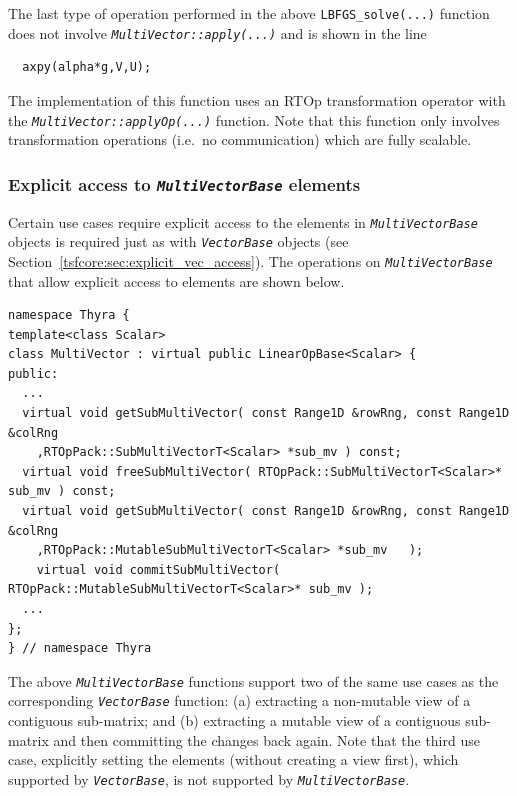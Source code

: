 \documentclass[pdf,ps2pdf,11pt]{SANDreport}
\begin{document}
The last type of operation performed in the above
{}\texttt{LBFGS\_solve(...)}  function does not involve
{}\texttt{\textit{Multi\-Vector\-::apply(\-...)}} and is shown in the
line

{\scriptsize\begin{verbatim}
  axpy(alpha*g,V,U);
\end{verbatim}}

{}\noindent{}The implementation of this function uses an RTOp
transformation operator with the
{}\texttt{\textit{Multi\-Vector\-::applyOp(\-...)}}  function.  Note
that this function only involves transformation operations (i.e.~no
communication) which are fully scalable.

%
\subsubsection{Explicit access to {}\texttt{\textit{Multi\-Vector\-Base}} elements}
\label{tsfcore:sec:explicit_multi_vec_access}
%

Certain use cases require explicit access to the elements in
{}\texttt{\textit{Multi\-Vector\-Base}} objects is required just as with
{}\texttt{\textit{Vector\-Base}} objects (see
Section~\ref{tsfcore:sec:explicit_vec_access}).  The operations on
{}\texttt{\textit{Multi\-Vector\-Base}} that allow explicit access to elements
are shown below.

{\scriptsize\begin{verbatim}
namespace Thyra {
template<class Scalar>
class MultiVector : virtual public LinearOpBase<Scalar> {
public:
  ...
  virtual void getSubMultiVector( const Range1D &rowRng, const Range1D &colRng
    ,RTOpPack::SubMultiVectorT<Scalar> *sub_mv ) const;
  virtual void freeSubMultiVector( RTOpPack::SubMultiVectorT<Scalar>* sub_mv ) const;
  virtual void getSubMultiVector( const Range1D &rowRng, const Range1D &colRng
    ,RTOpPack::MutableSubMultiVectorT<Scalar> *sub_mv	);
	virtual void commitSubMultiVector( RTOpPack::MutableSubMultiVectorT<Scalar>* sub_mv );
  ...
};
} // namespace Thyra
\end{verbatim}}

The above {}\texttt{\textit{Multi\-Vector\-Base}} functions support two of the
same use cases as the corresponding {}\texttt{\textit{Vector\-Base}}
function: (a) extracting a non-mutable view of a contiguous sub-matrix;
and (b) extracting a mutable view of a contiguous sub-matrix and then
committing the changes back again.  Note that the third use case,
explicitly setting the elements (without creating a view first), which
supported by {}\texttt{\textit{Vector\-Base}}, is not supported by
{}\texttt{\textit{Multi\-Vector\-Base}}.
\end{document}
